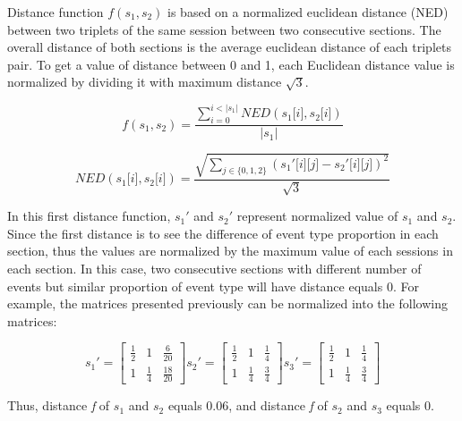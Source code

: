 \documentclass{vgtc}                          %
\begin{document}
Distance function $f(\textit{s}_1,\textit{s}_2)$ is based on a normalized euclidean distance (NED) between two triplets of the same session between two consecutive sections. The overall distance of both sections is the average euclidean distance of each triplets pair. To get a value of distance between 0 and 1, each Euclidean distance value is normalized by dividing it with maximum distance $\sqrt{3}$.

$$f(\textit{s}_1,\textit{s}_2) = \frac{\displaystyle\sum_{i=0}^{i < \lvert\textit{s}_1\lvert} \textit{N}ED(\textit{s}_1\lbrack i \rbrack,\textit{s}_2\lbrack i \rbrack)}{ \lvert\textit{s}_1\lvert}$$

$$ \textit{N}ED(\textit{s}_1\lbrack i \rbrack,\textit{s}_2\lbrack i \rbrack) = \frac{\sqrt{\displaystyle\sum_{j \in \{0,1,2\}}(\textit{s}_1'\lbrack i \rbrack\lbrack j \rbrack - \textit{s}_2'\lbrack i \rbrack\lbrack j \rbrack)^2}}{\sqrt{3}}$$

In this first distance function, $\textit{s}_1'$ and $\textit{s}_2'$ represent normalized value of $\textit{s}_1$ and $\textit{s}_2$. Since the first distance is to see the difference of event type proportion in each section, thus the values are normalized by the maximum value of each sessions in each section. In this case, two consecutive sections with different number of events but similar proportion of event type will have distance equals 0.  For example, the matrices presented previously can be normalized into the following matrices:

\[
s_1' = \begin{bmatrix}
  \frac{1}{2} & 1 & \frac{6}{20}\\ 
  1 & \frac{1}{4} & \frac{18}{20}
\end{bmatrix}
s_2' = \begin{bmatrix}
  \frac{1}{2} & 1 & \frac{1}{4}\\
  1 & \frac{1}{4} & \frac{3}{4} 
\end{bmatrix}
s_3' = \begin{bmatrix}
  \frac{1}{2} & 1 & \frac{1}{4}\\
  1 & \frac{1}{4} & \frac{3}{4} 
\end{bmatrix}
\]

Thus, distance \textit{f} of $s_1$ and $s_2$ equals 0.06, and distance \textit{f} of $s_2$ and $s_3$ equals 0.
\end{document}
